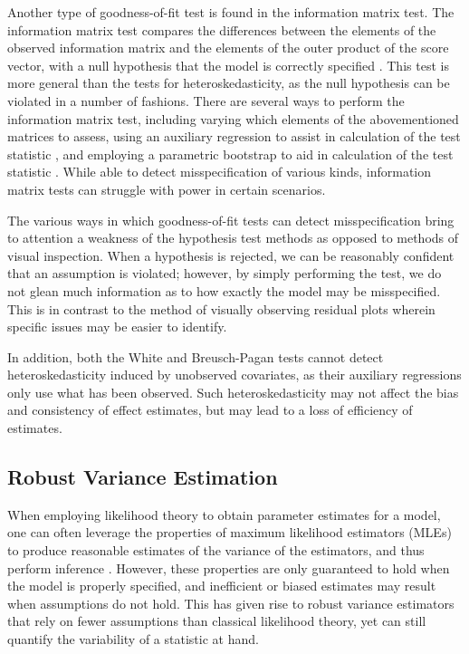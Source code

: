 \documentclass[submit]{smj}
\begin{document}
		Another type of goodness-of-fit test is found in the information matrix test. The information matrix test compares the differences between the elements of the observed information matrix and the elements
		of the outer product of the score vector, with a null hypothesis that the model is correctly specified \citet{White1982}. This test is more general than the tests for heteroskedasticity, as the null
		hypothesis can be violated in a number of fashions. There are several ways to perform the information matrix test, including varying which elements of the abovementioned matrices to assess, using an 
		auxiliary regression to assist in calculation of the test statistic \citet{Chesher}, and employing a parametric bootstrap to aid in calculation of the test statistic \citet{Dhaene}. While able to
		detect misspecification of various kinds, information matrix tests can struggle with power in certain scenarios.

		The various ways in which goodness-of-fit tests can detect misspecification bring to attention a weakness of the hypothesis test methods as opposed to methods of visual inspection.
		When a hypothesis is rejected, we can be reasonably confident that an assumption is violated; however, by simply performing the test, we do not glean much information as to how exactly the
		model may be misspecified. This is in contrast to the method of visually observing residual plots wherein specific issues may be easier to identify.

		In addition, both the White and Breusch-Pagan tests cannot detect heteroskedasticity induced by unobserved covariates, as their auxiliary regressions only use what has been observed. Such heteroskedasticity
		may not affect the bias and consistency of effect estimates, but may lead to a loss of efficiency of estimates. 

	\subsection*{Robust Variance Estimation}

		When employing likelihood theory to obtain parameter estimates for a model, one can often leverage the properties of maximum likelihood estimators (MLEs) to produce reasonable estimates of the variance of the
		estimators, and thus perform inference \citet{Millar}. However, these properties are only guaranteed to hold when the model is properly specified, and inefficient or biased estimates may result when assumptions
		do not hold. This has given rise to robust variance estimators that rely on fewer assumptions than classical likelihood theory, yet can still quantify the variability of a statistic
		at hand.
\end{document}
